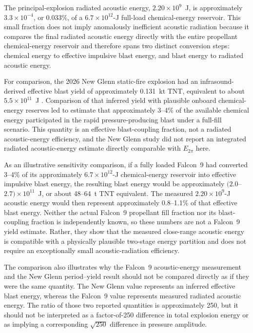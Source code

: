 \documentclass[]{seismica}
\begin{document}
The principal-explosion radiated acoustic energy,
$2.20\times10^9$~J, is approximately $3.3\times10^{-4}$, or 0.033\%, of a
$6.7\times10^{12}$-J full-load chemical-energy reservoir. This small fraction
does not imply anomalously inefficient acoustic radiation because it compares
the final radiated acoustic energy directly with the entire propellant
chemical-energy reservoir and therefore spans two distinct conversion steps:
chemical energy to effective impulsive blast energy, and blast energy to
radiated acoustic energy.

For comparison, the 2026 New Glenn static-fire explosion had an
infrasound-derived effective blast yield of approximately 0.131~kt TNT,
equivalent to about $5.5\times10^{11}$~J
\citep{silber_scamfer_newglenn_2026}. Comparison of that inferred yield with
plausible onboard chemical-energy reserves led
\citet{silber_scamfer_newglenn_2026} to estimate that approximately 3--4\%
of the available chemical energy participated in the rapid pressure-producing
blast under a full-fill scenario. This quantity is an effective blast-coupling
fraction, not a radiated acoustic-energy efficiency, and the New Glenn study
did not report an integrated radiated acoustic-energy estimate directly
comparable with $E_{2\pi}$ here.

As an illustrative sensitivity comparison, if a fully loaded Falcon~9 had
converted 3--4\% of its approximately $6.7\times10^{12}$-J chemical-energy
reservoir into effective impulsive blast energy, the resulting blast energy
would be approximately $(2.0$--$2.7)\times10^{11}$~J, or about 48--64~t TNT
equivalent. The measured $2.20\times10^9$-J acoustic energy would then
represent approximately 0.8--1.1\% of that effective blast energy. Neither the
actual Falcon~9 propellant fill fraction nor its blast-coupling fraction is
independently known, so these numbers are not a Falcon~9 yield estimate.
Rather, they show that the measured close-range acoustic energy is compatible
with a physically plausible two-stage energy partition and does not require an
exceptionally small acoustic-radiation efficiency.

The comparison also illustrates why the Falcon~9 acoustic-energy measurement
and the New Glenn period--yield result should not be compared directly as if
they were the same quantity. The New Glenn value represents an inferred
effective blast energy, whereas the Falcon~9 value represents measured
radiated acoustic energy. The ratio of those two reported quantities is
approximately 250, but it should not be interpreted as a factor-of-250
difference in total explosion energy or as implying a corresponding
$\sqrt{250}$ difference in pressure amplitude.
\end{document}

